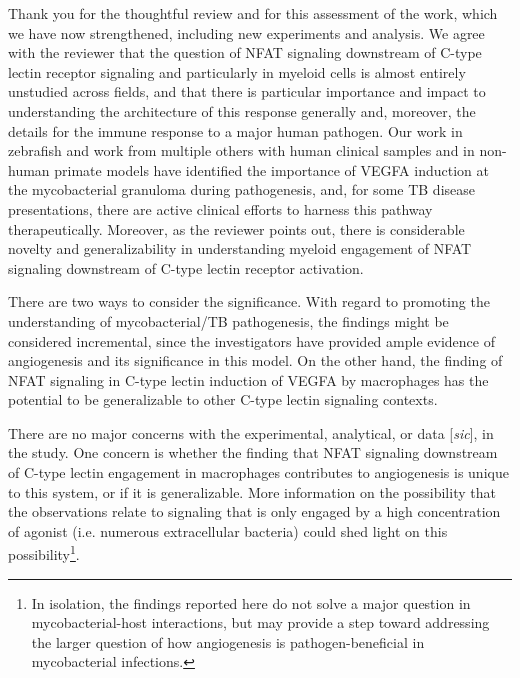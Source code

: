 \begin{description}[style=multiline, labelwidth=\widthof{Reviewer \#2:   }, font=\normalfont, leftmargin=\labelwidth, align=right]
\item[Response: ] \quad Thank you for the thoughtful review and for this assessment of the work, which we have now strengthened, including new experiments and analysis. We agree with the reviewer that the question of NFAT signaling downstream of C\hyp{}type lectin receptor signaling and particularly in myeloid cells is almost entirely unstudied across fields, and that there is particular importance and impact to understanding the architecture of this response generally and, moreover, the details for the immune response to a major human pathogen. Our work in zebrafish and work from multiple others with human clinical samples and in non\hyp{}human primate models have identified the importance of VEGFA induction at the mycobacterial granuloma during pathogenesis, and, for some TB disease presentations, there are active clinical efforts to harness this pathway therapeutically. Moreover, as the reviewer points out, there is considerable novelty and generalizability in understanding myeloid engagement of NFAT signaling downstream of C\hyp{}type lectin receptor activation.

\item[Reviewer \#1: ] \quad There are two ways to consider the significance. With regard to promoting the understanding of mycobacterial/TB pathogenesis, the findings might be considered incremental, since the investigators have provided ample evidence of angiogenesis and its significance in this model. On the other hand, the finding of NFAT signaling in C\hyp{}type lectin induction of VEGFA by macrophages has the potential to be generalizable to other C\hyp{}type lectin signaling contexts.

\item \quad There are no major concerns with the experimental, analytical, or data [\textit{sic}], in the study. One concern is whether the finding that NFAT signaling downstream of C\hyp{}type lectin engagement in macrophages contributes to angiogenesis is unique to this system, or if it is generalizable. More information on the possibility that the observations relate to signaling that is only engaged by a high concentration of agonist (i.e. numerous extracellular bacteria) could shed light on this possibility\footnote{In isolation, the findings reported here do not solve a major question in mycobacterial\hyp{}host interactions, but may provide a step toward addressing the larger question of how angiogenesis is pathogen\hyp{}beneficial in mycobacterial infections.}.


\end{description}
